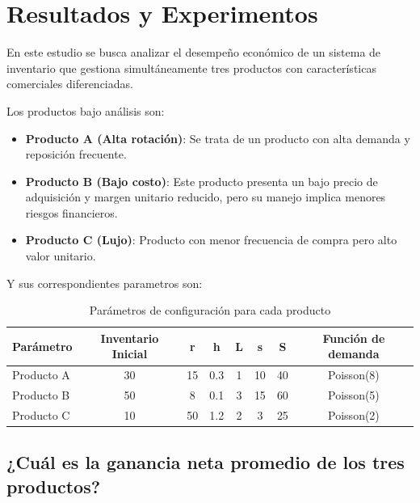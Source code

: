 \documentclass{report}
\begin{document}
\section{Resultados y Experimentos}\label{S3}

    En este estudio se busca analizar el desempeño económico de un sistema de inventario que gestiona simultáneamente tres productos con características comerciales diferenciadas. 

    Los productos bajo análisis son:
    \begin{itemize}
        \item \textbf{Producto A (Alta rotación)}: Se trata de un producto con alta demanda y reposición frecuente.
        
        \item \textbf{ Producto B (Bajo costo)}: Este producto presenta un bajo precio de adquisición y margen unitario reducido, pero su manejo implica menores riesgos financieros. 

        \item \textbf{Producto C (Lujo)}: Producto con menor frecuencia de compra pero alto valor unitario. 
    \end{itemize}

    Y sus correspondientes parametros son:

    \begin{table}[h]
        \centering
        \begin{tabular}{|l|c|c|c|c|c|c|c|}
        \hline
        \textbf{Parámetro} & \textbf{Inventario Inicial} & \textbf{r} & \textbf{h} & \textbf{L} & \textbf{s} & \textbf{S} & \textbf{Función de demanda} \\ \hline
        Producto A & 30 & 15 & 0.3 & 1 & 10 & 40 & Poisson(8) \\ \hline
        Producto B & 50 & 8 & 0.1 & 3 & 15 & 60 & Poisson(5) \\ \hline
        Producto C & 10 & 50 & 1.2 & 2 & 3 & 25 & Poisson(2) \\ \hline
        \end{tabular}
        \caption{Parámetros de configuración para cada producto}
        \label{tab:product_params}
    \end{table}

    \subsection{¿Cuál es la ganancia neta promedio de los tres productos?}
\end{document}
